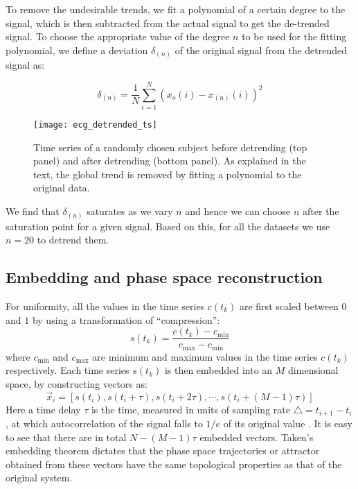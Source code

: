\documentclass[9pt,twocolumn,twoside]{pnas-new}
\begin{document}
{To remove the undesirable trends, we fit a polynomial of a certain degree to the signal, which is then subtracted from the actual signal to get the de-trended signal. To choose the appropriate value of the degree $n$ to be used for the fitting polynomial, we define a deviation $\delta_{(n)}$ of the original signal from the detrended signal as:

\begin{equation}
\delta_{(n)} = \frac{1}{N}\sum\limits_{i=1}^{N}(x_o(i)-x_{(n)}(i))^2
\end{equation}

\begin{figure}
\begin{center}
\texttt{[image: ecg\_detrended\_ts]}
\caption{\label{ecg_detrended_ts} Time series of a randomly chosen subject before detrending (top panel) and after detrending (bottom panel). As explained in the text, the global trend is removed by fitting a polynomial to the original data. }
\end{center}
\end{figure}
We find that $\delta_{(n)}$ saturates as we vary $n$ and hence we can choose $n$ after the saturation point for a given signal. Based on this, for all the datasets we use $n=20$ to detrend them. 


\subsection*{Embedding and phase space reconstruction}
For uniformity, all the values in the time series $c(t_k)$ are first scaled between $0$ and $1$ by using a transformation of ``compression'':
\begin{equation}
s(t_k) = \frac{c(t_k)-c_{\text{min}}}{c_{\text{max}}-c_{\text{min}}}
\end{equation}
where $c_{\text{min}}$ and $c_{\text{max}}$ are minimum and maximum values in the time series $c(t_k)$ respectively. 
Each time series $s(t_k)$ is then embedded into an $M$ dimensional space, by constructing vectors as:
\begin{equation}
\vec{x}_i = [s(t_i), s(t_i + \tau), s(t_i + 2\tau), \cdots, s(t_i + (M-1)\tau)]
\end{equation}
Here a time delay $\tau$ is the time, measured in units of sampling rate $\triangle = t_{i+1}-t_i$, at which autocorrelation of the signal falls to $1/e$ of its original value \cite{harikrishnan2006non}. It is easy to see that there are in total $N-(M-1)\tau$ embedded vectors. Taken's embedding theorem dictates that the phase space trajectories or attractor obtained from these vectors have the same topological properties as that of the original system\cite{takens1981dynamical}.

}
\end{document}
